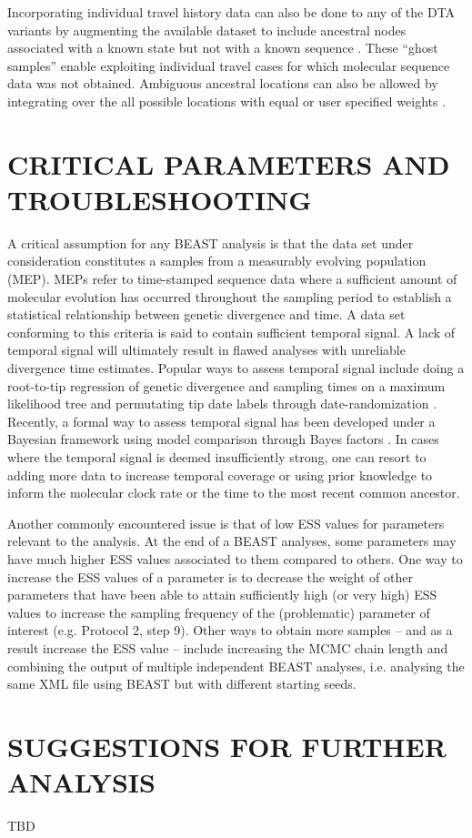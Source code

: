 \documentclass{article}
\begin{document}
\begin{multicols}{2}
Incorporating individual travel history data can also be done to any of the DTA variants %
by augmenting the available dataset to include ancestral nodes associated with a known state but not with a known sequence \cite{travhist}.
These ``ghost samples'' enable exploiting individual travel cases for which molecular sequence data was not obtained. %
Ambiguous ancestral locations can also be allowed by integrating over the all possible locations with equal or user specified weights \cite{ambig}. %

\section*{CRITICAL PARAMETERS AND TROUBLESHOOTING}
A critical assumption for any BEAST analysis is that the data set under consideration constitutes a samples from a measurably evolving population (MEP). MEPs \cite{mep1,mep2} refer to time-stamped sequence data where a sufficient amount of molecular evolution has occurred throughout the sampling period to establish a statistical relationship between genetic divergence and time. A data set conforming to this criteria is said to contain sufficient temporal signal. A lack of temporal signal will ultimately result in flawed analyses with unreliable divergence time estimates. Popular ways to assess temporal signal include doing a root-to-tip regression of genetic divergence and sampling times on a maximum likelihood tree \cite{tempest} and permutating tip date labels through date-randomization \cite{tipdate}. Recently, a formal way to assess temporal signal has been developed under a Bayesian framework using model comparison through Bayes factors \cite{bets}. In cases where the temporal signal is deemed insufficiently strong, one can resort to adding more data to increase temporal coverage or using prior knowledge to inform the molecular clock rate or the time to the most recent common ancestor.

Another commonly encountered issue is that of low ESS values for parameters relevant to the analysis. At the end of a BEAST analyses, some parameters may have much higher ESS values associated to them compared to others. One way to increase the ESS values of a parameter is to decrease the weight of other parameters that have been able to attain sufficiently high (or very high) ESS values to increase the sampling frequency of the (problematic) parameter of interest (e.g. Protocol 2, step 9). Other ways to obtain more samples -- and as a result increase the ESS value -- include increasing the MCMC chain length and combining the output of multiple independent BEAST analyses, i.e. analysing the same XML file using BEAST but with different starting seeds.

\section*{SUGGESTIONS FOR FURTHER ANALYSIS}

TBD




\end{multicols}
\end{document}
